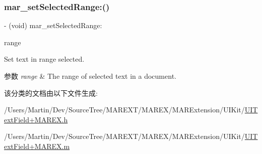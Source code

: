 \subsubsection{\texorpdfstring{mar\+\_\+set\+Selected\+Range\+:()}{mar\_setSelectedRange:()}}
{\footnotesize\ttfamily -\/ (void) mar\+\_\+set\+Selected\+Range\+: \begin{DoxyParamCaption}\item[{(N\+S\+Range)}]{range }\end{DoxyParamCaption}}

Set text in range selected.


\begin{DoxyParams}{参数}
{\em range} & The range of selected text in a document. \\
\hline
\end{DoxyParams}


该分类的文档由以下文件生成\+:\begin{DoxyCompactItemize}
\item 
/\+Users/\+Martin/\+Dev/\+Source\+Tree/\+M\+A\+R\+E\+X\+T/\+M\+A\+R\+E\+X/\+M\+A\+R\+Extension/\+U\+I\+Kit/\hyperlink{_u_i_text_field_09_m_a_r_e_x_8h}{U\+I\+Text\+Field+\+M\+A\+R\+E\+X.\+h}\item 
/\+Users/\+Martin/\+Dev/\+Source\+Tree/\+M\+A\+R\+E\+X\+T/\+M\+A\+R\+E\+X/\+M\+A\+R\+Extension/\+U\+I\+Kit/\hyperlink{_u_i_text_field_09_m_a_r_e_x_8m}{U\+I\+Text\+Field+\+M\+A\+R\+E\+X.\+m}\end{DoxyCompactItemize}
